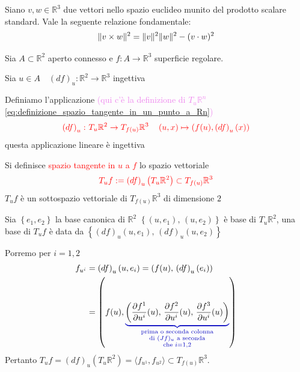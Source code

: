         \begin{richiamo}
        Siano $v, w \in \mathbb{R}^3$ due vettori nello spazio euclideo munito del prodotto scalare standard.
        Vale la seguente relazione fondamentale:
        \begin{equation}
        \label{eq:norma_prodotto_vettoriale}
        \lVert v \times w\rVert^2 = \lVert v\rVert^2 \lVert w\rVert^2 - (v \cdot w)^2
        \end{equation}
        \end{richiamo}
        \newpage
        \begin{definizione}
        Sia  $A \subset \mathbb{R}^2$ aperto connesso e $f \colon A \to \mathbb{R}^3$ superficie regolare.

        Sia $u \in A \quad \left(df\right)_u \colon \mathbb{R}^2 \to \mathbb{R}^3$ ingettiva 

        Definiamo l'applicazione \textcolor{violet}{(qui c'è la definizione di $T_u \mathbb{R}^n$ \eqref{eq:definizione_spazio_tangente_in_un_punto_a_Rn})}
        \[ \color{red} \left(df\right)_u \colon T_u \mathbb{R}^2 \to T_{f(u)} \mathbb{R}^3 \quad \left(u,x\right) \mapsto \left(f(u), \left(df\right)_u(x)\right) \]
        questa applicazione lineare è ingettiva 
        
        Si definisce \textcolor{red}{spazio tangente in $u$ a $f$} lo spazio vettoriale 
        \begin{equation}
        \label{eq:def_spazio_tangente_in_un_punto_ad_una_superficie}
        \color{red} T_u f:= \left(df\right)_u \left(T_u \mathbb{R}^2 \right) \subset T_{f(u)} \mathbb{R}^3 
        \end{equation}
        $T_u f$ è un sottospazio vettoriale di $T_{f(u)} \mathbb{R}^3$ di dimensione $2$
        
        Sia $\left\{e_1, e_2\right\}$ la base canonica di $\mathbb{R}^2$ $\left\{ \left(u, e_1\right), \, \left(u, e_2\right) \right\}$ è
        base di $T_u \mathbb{R}^2$, una base di $T_u f$ è data da 
        $\left\{\left(df\right)_u \left(u, e_1\right), \, \left(df\right)_u \left(u, e_2\right) \right\}$

        Porremo per $i=1,2$
        \begin{align*}
        f_{u^i} &= \left(df\right)_u \left(u, e_i\right) = \left(f(u), \, \left(df\right)_u \left(e_i\right)\right) \\
        &= \left(f(u), \textcolor{blu}{\underbrace{ \textcolor{black}{\left( \frac{\partial f^1}{\partial u^i}(u), \, \frac{\partial f^2}{\partial u^i}(u), \, \frac{\partial f^3}{\partial u^i}(u) \right)}}_{\substack{\text{prima o seconda colonna} \\ \text{di } (Jf)_u \text{ a seconda} \\ \text{che } i=1,2}}} \right)
        \end{align*}
        Pertanto $T_u f = \left(df\right)_u \left(T_u \mathbb{R}^2 \right) = \langle f_{u^1}, f_{u^2} \rangle \subset T_{f(u)} \mathbb{R}^3$.
        \end{definizione}
